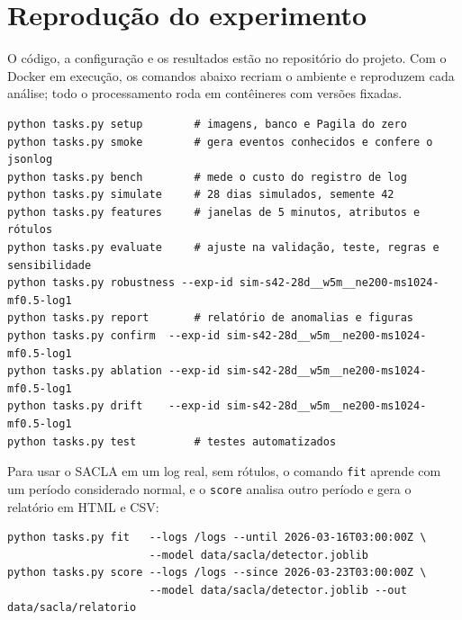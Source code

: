 
\section{Reprodução do experimento}
\label{apd:apendice-b}

O código, a configuração e os resultados estão no repositório do projeto. Com o Docker em
execução, os comandos abaixo recriam o ambiente e reproduzem cada análise; todo o processamento
roda em contêineres com versões fixadas.

\begin{lstlisting}[numbers=none]
python tasks.py setup        # imagens, banco e Pagila do zero
python tasks.py smoke        # gera eventos conhecidos e confere o jsonlog
python tasks.py bench        # mede o custo do registro de log
python tasks.py simulate     # 28 dias simulados, semente 42
python tasks.py features     # janelas de 5 minutos, atributos e rótulos
python tasks.py evaluate     # ajuste na validação, teste, regras e sensibilidade
python tasks.py robustness --exp-id sim-s42-28d__w5m__ne200-ms1024-mf0.5-log1
python tasks.py report       # relatório de anomalias e figuras
python tasks.py confirm  --exp-id sim-s42-28d__w5m__ne200-ms1024-mf0.5-log1
python tasks.py ablation --exp-id sim-s42-28d__w5m__ne200-ms1024-mf0.5-log1
python tasks.py drift    --exp-id sim-s42-28d__w5m__ne200-ms1024-mf0.5-log1
python tasks.py test         # testes automatizados
\end{lstlisting}

Para usar o SACLA em um log real, sem rótulos, o comando \texttt{fit} aprende com um período
considerado normal, e o \texttt{score} analisa outro período e gera o relatório em HTML e CSV:

\begin{lstlisting}[numbers=none]
python tasks.py fit   --logs /logs --until 2026-03-16T03:00:00Z \
                      --model data/sacla/detector.joblib
python tasks.py score --logs /logs --since 2026-03-23T03:00:00Z \
                      --model data/sacla/detector.joblib --out data/sacla/relatorio
\end{lstlisting}
